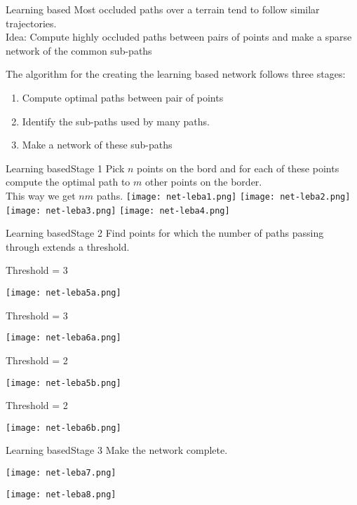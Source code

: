 
\begin{frame}{Learning based}
	\only<1> {
		Most occluded paths over a terrain tend to follow similar trajectories.  \\
		Idea: Compute highly occluded paths between pairs of points and make a sparse network of the common sub-paths
	}
	\only<2> {
		The algorithm for the creating the learning based network follows three stages:
		\begin{enumerate}
			\item Compute optimal paths between pair of points
			\item Identify the sub-paths used by many paths.
			\item Make a network of these sub-paths
		\end{enumerate}
	}
\end{frame}

\begin{frame}{Learning based}{Stage 1}
	\only<1> {
		Pick $n$ points on the bord and for each of these points compute the optimal path to $m$ other points on the border. \\
		This way we get $nm$ paths. 
	}
	\only<2> {
		\centering
		\texttt{[image: net-leba1.png]}
	}
	\only<3> {
		\centering
		\texttt{[image: net-leba2.png]}
	}
	\only<4> {
		\centering
		\texttt{[image: net-leba3.png]}
	}
	\only<5> {
		\centering
		\texttt{[image: net-leba4.png]}
	}
\end{frame}

\begin{frame}{Learning based}{Stage 2}
	\only<1> {
		Find points for which the number of paths passing through extends a threshold. 
	}
	\only<2> {
		Threshold = 3

		\centering
		\texttt{[image: net-leba5a.png]}
	}
	 {
		Threshold = 3

		\centering
		\texttt{[image: net-leba6a.png]}
	}
	 {
		Threshold = 2

		\centering
		\texttt{[image: net-leba5b.png]}
	}
	 {
		Threshold = 2

		\centering
		\texttt{[image: net-leba6b.png]}
	}
\end{frame} 

\begin{frame}{Learning based}{Stage 3}
	\only<1> {
		Make the network complete.
	}

	 {
		\centering
		\texttt{[image: net-leba7.png]}
	}

	 {
		\centering
		\texttt{[image: net-leba8.png]}
	}
\end{frame} 

